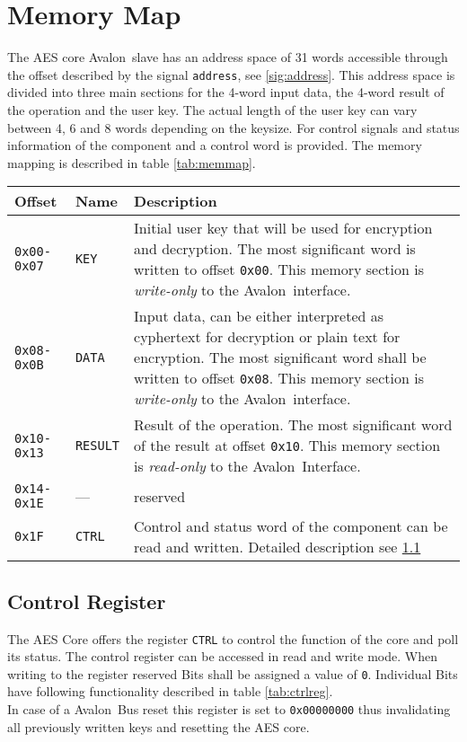 \documentclass{ruschidoc}
\begin{document}
\section{Memory Map}
\label{sec:memmap}
The AES core Avalon\rtm\ slave has an address space of 31 words accessible through the
offset described by the signal \texttt{address}, see \ref{sig:address}. This address
space is divided into three main sections for the 4-word input data, the 4-word
result of the operation and the user key. The actual length of the user key can vary
between 4, 6 and 8 words depending on the keysize. For control signals and status
information of the component and a control word is provided. The memory mapping is
described in table \ref{tab:memmap}.\\

\begin{tabularx}{\textwidth}{|p{18mm}|p{14mm} |X|}
  \hline
  \bf{Offset} 	  & \bf{Name} & \bf{Description}\\ \hline
  \texttt{0x00-0x07} & \texttt{KEY}  & Initial user key that will be used for encryption and decryption. 
	The most significant word is written to offset \texttt{0x00}. This memory section is \emph{write-only} to the Avalon\rtm\ interface.\\ 
\hline 	 
  \texttt{0x08-0x0B} & \texttt{DATA} & Input data, can be either interpreted as cyphertext for decryption or plain text for encryption. 
	The most significant word shall be written to offset \texttt{0x08}. This memory section is \emph{write-only} to the Avalon\rtm\ interface. \\ 
\hline
  \texttt{0x10-0x13} & \texttt{RESULT} & Result of the operation. The most significant word of the result at offset \texttt{0x10}.  
	This memory section is \emph{read-only} to the Avalon\rtm\ Interface.  \\ 
\hline	 
   \texttt{0x14-0x1E} & --- &  reserved  \\ \hline	 
 \texttt{0x1F} & \texttt{CTRL} & Control and status word of the component can be read and written. Detailed description see \ref{sec:ctrl}\\ 
\hline	
\end{tabularx}
\label{tab:memmap}

\subsection{Control Register}
\label{sec:ctrl}
The AES Core offers the register \texttt{CTRL} to control the function of the core
and poll its status. The control register can be accessed in read and write mode.
 When writing to the register reserved Bits shall be assigned a value of \texttt{0}.
 Individual Bits have following functionality described in table \ref{tab:ctrlreg}. \\
In case of a Avalon\rtm\ Bus reset this register is set to \texttt{0x00000000} thus
invalidating all previously written keys and resetting the AES core.
\end{document}
